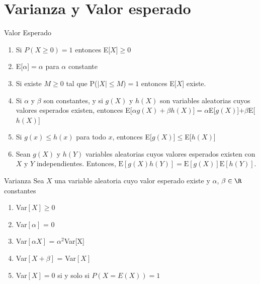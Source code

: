 \documentclass[10pt]{beamer}
\begin{document}
  \section{Varianza y Valor esperado}
  \begin{frame}{Valor Esperado}
    \begin{enumerate}
      \item Si $P(X \geq 0) = 1$ entonces E[$X$]$\geq 0$
      \item E[$\alpha$]$= \alpha$ para $\alpha$ constante
      \item Si existe $M \geq 0$ tal que P($|X| \leq M$)$=1$ entonces E[$X$] existe. 
      \item Si $\alpha$ y $\beta$ son constantes, y si 
            $g(X)$ y $h(X)$ son variables aleatorias cuyos valores esperados existen, 
            entonces E[$\alpha g(X) + \beta h(X)$]$= \alpha$E[$g(X)$]$+ \beta$E[$h(X)$]
      \item Si  $g(x)\leq h(x)$ para todo $x$, entonces E$[g(X)$]$\leq$E[$h(X)$]
      \item Sean $g(X)$ y $h(Y)$ variables aleatorias cuyos valores esperados
      existen con $X$ y $Y$ independientes. Entonces,
      $\text{E}[g(X)h(Y)]=\text{E}[g(X)]\text{E}[h(Y)]$.
  \end{enumerate}
  \end{frame}
  \begin{frame}{Varianza}
    Sea $X$ una variable aleatoria cuyo valor esperado existe y 
    $\alpha$, $\beta \in \R$ constantes
    \begin{enumerate}
      \item Var$[X] \geq 0$ 
      \item Var$[\alpha]$ = 0
      \item Var$[\alpha X]$ = $\alpha^2$Var[X]
      \item Var$[X + \beta]$ = Var$[X]$
      \item Var$[X] = 0$ si y solo si $P(X=E(X))=1$ 
  \end{enumerate}
  \end{frame}
\end{document}
